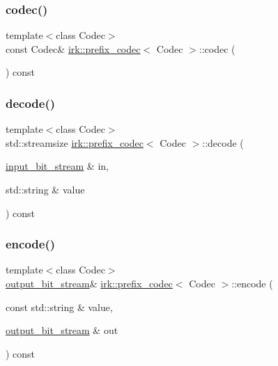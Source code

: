 \subsubsection{\texorpdfstring{codec()}{codec()}}
{\footnotesize\ttfamily template$<$class Codec$>$ \\
const Codec\& \mbox{\hyperlink{classirk_1_1prefix__codec}{irk\+::prefix\+\_\+codec}}$<$ Codec $>$\+::codec (\begin{DoxyParamCaption}{ }\end{DoxyParamCaption}) const\hspace{0.3cm}{\ttfamily [inline]}}

\mbox{\label{classirk_1_1prefix__codec_a2425c1519ca2e5233b7b3e0354bc86f4}} 
\subsubsection{\texorpdfstring{decode()}{decode()}}
{\footnotesize\ttfamily template$<$class Codec$>$ \\
std\+::streamsize \mbox{\hyperlink{classirk_1_1prefix__codec}{irk\+::prefix\+\_\+codec}}$<$ Codec $>$\+::decode (\begin{DoxyParamCaption}\item[{\mbox{\hyperlink{classirk_1_1input__bit__stream}{input\+\_\+bit\+\_\+stream}} \&}]{in,  }\item[{std\+::string \&}]{value }\end{DoxyParamCaption}) const\hspace{0.3cm}{\ttfamily [inline]}}

\mbox{\label{classirk_1_1prefix__codec_af560960a2c1b09d397a6696fc4204fcc}} 
\subsubsection{\texorpdfstring{encode()}{encode()}}
{\footnotesize\ttfamily template$<$class Codec$>$ \\
\mbox{\hyperlink{classirk_1_1output__bit__stream}{output\+\_\+bit\+\_\+stream}}\& \mbox{\hyperlink{classirk_1_1prefix__codec}{irk\+::prefix\+\_\+codec}}$<$ Codec $>$\+::encode (\begin{DoxyParamCaption}\item[{const std\+::string \&}]{value,  }\item[{\mbox{\hyperlink{classirk_1_1output__bit__stream}{output\+\_\+bit\+\_\+stream}} \&}]{out }\end{DoxyParamCaption}) const\hspace{0.3cm}{\ttfamily [inline]}}

